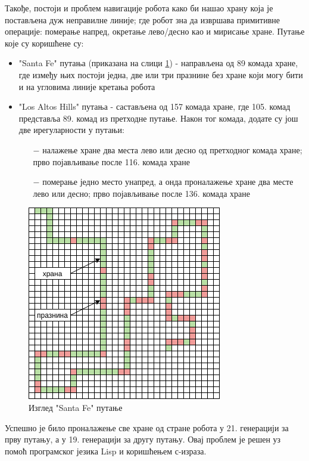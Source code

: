 \documentclass[a4paper]{article}
\begin{document}
Такође, постоји и проблем навигације робота како би нашао храну која је постављена дуж неправилне линије; где робот зна да извршава примитивне операције: померање напред, окретање лево/десно као и мирисање хране. Путање које су коришћене су:
\begin{itemize}
	\item "Santa Fe" путања (приказана на слици \ref{fig:santa_fe}) - направљена од 89 комада хране, где између њих постоји једна, две или три празнине без хране који могу бити и на угловима линије кретања робота
	\item "Los Altos Hills" путања - састављена од 157 комада хране, где 105. комад представља 89. комад из претходне путање. Након тог комада, додате су још две ирегуларности у путањи:
	\begin{itemize}
		\item[$-$] налажење хране два места лево или десно од претходног комада хране; прво појављивање после 116. комада хране 
		\item[$-$] померање једно место унапред, а онда проналажење хране два месте лево или десно; прво појављивање после 136. комада хране
	\end{itemize}
\end{itemize}

\begin{figure}[h!]
    \begin{center}
        \includegraphics[scale=0.55]{santa_fe.png}
    \end{center}
    \caption{Изглед "Santa Fe" путање}
    \label{fig:santa_fe}
\end{figure}

Успешно је било проналажење све хране од стране робота у 21. генерацији за прву путању, а у 19. генерацији за другу путању. \cite{robo2} Овај проблем је решен уз помоћ програмског језика Lisp и коришћењем с-израза. \cite{lisp}
\end{document}

